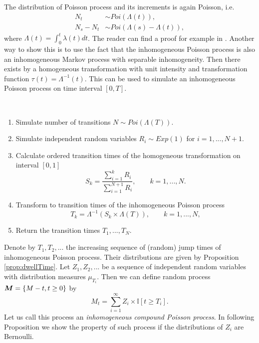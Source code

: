 {The distribution of Poisson process and its increments is again Poisson, i.e.
\begin{align*}
	N_t & \sim Poi (\Lambda(t)), \\
	N_s - N_t & \sim Poi (\Lambda(s) - \Lambda(t)),
\end{align*}
where $\Lambda(t) = \int_0^t \lambda(t) dt$.
The reader can find a proof for example in \cite{Lewis79}. Another way to show this is to use the fact that the inhomogeneous Poisson process is also an inhomogeneous Markov process with separable inhomogeneity. Then there exists by  a homogeneous transformation with unit intensity and transformation function $\tau (t) = \Lambda^{-1} (t)$. This can be used to simulate an inhomogeneous Poisson process on time interval $[0, T]$.

\begin{algorithm}\
	\label{algo:simulPoisson}
	\begin{enumerate}
		\item Simulate number of transitions $N \sim Poi (\Lambda(T))$.
		\item Simulate independent random variables $R_i \sim Exp(1)$ for $i = 1, ..., N+1$.
		\item Calculate ordered transition times of the homogeneous transformation on interval $[0,1]$
			\[
				S_k = \frac{\sum_{i=1}^{k} R_i}{\sum_{i=1}^{N+1} R_i}, \qquad k = 1, ..., N.
			\]
		\item Transform to transition times of the inhomogeneous Poisson process
			\[
				T_k = \Lambda^{-1} (S_k \times \Lambda(T)), \qquad k = 1, ..., N,
			\]
		\item Return the transition times $T_1, ..., T_N$.
	\end{enumerate}
\end{algorithm}



Denote by $T_1, T_2, ...$ the increasing sequence of (random) jump times of inhomogeneous Poisson process. Their distributions are given by Proposition \ref{prop:dwellTime}. Let $Z_1, Z_2, ...$ be a sequence of independent random variables with distribution measures $\mu_{T_i}$. Then we can define random process $\bm{M} = \{ M-t, t \geq 0 \}$ by
\[
	M_t = \sum_{i=1}^{\infty} Z_i \times \mathbb{I} [t \geq T_i].
\]
Let us call this process an \emph{inhomogeneous compound Poisson process}. In following Proposition we show the property of such process if the distributions of $Z_i$ are Bernoulli.

}
